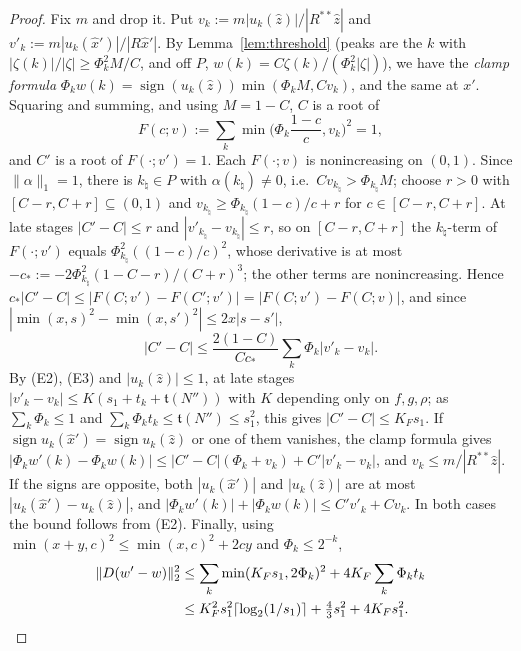 \documentclass[10pt]{amsart}
\theoremstyle{definition}
\theoremstyle{remark}
\newcommand{\sgn}{\operatorname{sign}}
\newcommand{\zh}{\hat z}
\begin{document}
\begin{proof}
Fix $m$ and drop it.  Put $v_k:=m|u_k(\zh)|/|R^{**}\zh|$ and
$v'_k:=m|u_k(\hat x')|/|R\hat x'|$.  By Lemma~\ref{lem:threshold} (peaks
are the $k$ with $|\zeta(k)|/|\zeta|\ge\Phi_k^2M/C$, and off $P$,
$w(k)=C\zeta(k)/(\Phi_k^2|\zeta|)$), we have the \emph{clamp formula}
$\Phi_kw(k)=\sgn(u_k(\zh))\min(\Phi_kM,Cv_k)$, and the same at $x'$.
Squaring and summing, and using $M=1-C$, $C$ is a root of
\[
 F(c;v):=\sum_k\min\Big(\Phi_k\frac{1-c}c,v_k\Big)^2=1,
\]
and $C'$ is a root of $F(\cdot;v')=1$.  Each $F(\cdot;v)$ is nonincreasing on
$(0,1)$.  Since $\|\alpha\|_1=1$, there is $k_\natural\in P$ with
$\alpha(k_\natural)\ne0$, i.e.\ $Cv_{k_\natural}>\Phi_{k_\natural}M$; choose
$r>0$ with $[C-r,C+r]\subseteq(0,1)$ and $v_{k_\natural}\ge
\Phi_{k_\natural}(1-c)/c+r$ for $c\in[C-r,C+r]$.  At late stages
$|C'-C|\le r$ and $|v'_{k_\natural}-v_{k_\natural}|\le r$, so on
$[C-r,C+r]$ the $k_\natural$-term of $F(\cdot;v')$ equals
$\Phi_{k_\natural}^2((1-c)/c)^2$, whose derivative is at most
$-c_*:=-2\Phi_{k_\natural}^2(1-C-r)/(C+r)^3$; the other terms are
nonincreasing.  Hence $c_*|C'-C|\le|F(C;v')-F(C';v')|=|F(C;v')-F(C;v)|$, and
since $|\min(x,s)^2-\min(x,s')^2|\le2x|s-s'|$,
\[
 |C'-C|\le\frac{2(1-C)}{Cc_*}\sum_k\Phi_k|v'_k-v_k| .
\]
By (E2), (E3) and $|u_k(\zh)|\le1$, at late stages $|v'_k-v_k|\le
K(s_1+t_k+\mathfrak t(N''))$ with $K$ depending only on $f,g,\rho$; as
$\sum_k\Phi_k\le1$ and $\sum_k\Phi_kt_k\le\mathfrak t(N'')\le s_1^2$, this gives
$|C'-C|\le K_Fs_1$.  If $\sgn u_k(\hat x')=\sgn u_k(\zh)$ or one of them
vanishes, the clamp formula gives $|\Phi_kw'(k)-\Phi_kw(k)|\le
|C'-C|(\Phi_k+v_k)+C'|v'_k-v_k|$, and $v_k\le m/|R^{**}\zh|$.  If the signs
are opposite, both $|u_k(\hat x')|$ and $|u_k(\zh)|$ are at most
$|u_k(\hat x')-u_k(\zh)|$, and $|\Phi_kw'(k)|+|\Phi_kw(k)|\le C'v'_k+Cv_k$.
In both cases the bound follows from (E2).  Finally, using
$\min(x+y,c)^2\le\min(x,c)^2+2cy$ and $\Phi_k\le2^{-k}$,
\begin{align*}
 \|D(w'-w)\|_2^2&\le\sum_k\min(K_Fs_1,2\Phi_k)^2+4K_F\sum_k\Phi_kt_k\\
 &\le K_F^2s_1^2\lceil\log_2(1/s_1)\rceil+\tfrac43s_1^2+4K_Fs_1^2 .
 \qedhere
\end{align*}
\end{proof}
\end{document}
